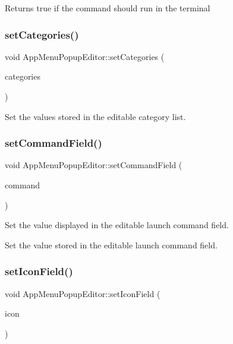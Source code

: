 \begin{DoxyReturn}{Returns}
true if the command should run in the terminal 
\end{DoxyReturn}
\mbox{\label{classAppMenuPopupEditor_a8edb399ea0db5f0d6f5e5f0b4fa4dd68}} 
\subsubsection{\texorpdfstring{set\+Categories()}{setCategories()}}
{\footnotesize\ttfamily void App\+Menu\+Popup\+Editor\+::set\+Categories (\begin{DoxyParamCaption}\item[{String\+Array}]{categories }\end{DoxyParamCaption})}

Set the values stored in the editable category list. \mbox{\label{classAppMenuPopupEditor_aff3cb0549f7ecd2aa7c0a18851f7e65f}} 
\subsubsection{\texorpdfstring{set\+Command\+Field()}{setCommandField()}}
{\footnotesize\ttfamily void App\+Menu\+Popup\+Editor\+::set\+Command\+Field (\begin{DoxyParamCaption}\item[{String}]{command }\end{DoxyParamCaption})}

Set the value displayed in the editable launch command field.

Set the value stored in the editable launch command field. \mbox{\label{classAppMenuPopupEditor_a7ff894257d04bf4c5a643dfc796cbbf8}} 
\subsubsection{\texorpdfstring{set\+Icon\+Field()}{setIconField()}}
{\footnotesize\ttfamily void App\+Menu\+Popup\+Editor\+::set\+Icon\+Field (\begin{DoxyParamCaption}\item[{String}]{icon }\end{DoxyParamCaption})}

